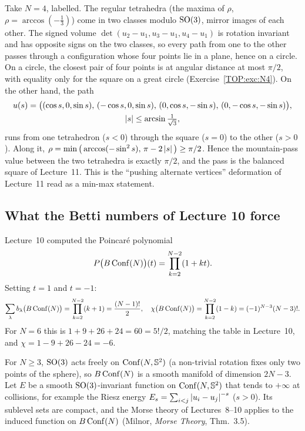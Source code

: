 \begin{example}\label{TOP:ex:N4pass}
Take $N=4$, labelled. The regular tetrahedra (the maxima of $\rho$, $\rho=\arccos(-\tfrac13)$) come
in two classes modulo $\mathrm{SO}(3)$, mirror images of each other. The signed volume
$\det(u_2-u_1,u_3-u_1,u_4-u_1)$ is rotation invariant and has opposite signs on the two classes, so every
path from one to the other passes through a configuration whose four points lie in a plane, hence on a
circle. On a circle, the closest pair of four points is at angular distance at most $\pi/2$, with equality
only for the square on a great circle (Exercise~\ref{TOP:exc:N4}). On the other hand, the path
\[
\begin{gathered}
  u(s)=\big((\cos s,0,\sin s),\,(-\cos s,0,\sin s),\,(0,\cos s,-\sin s),\,(0,-\cos s,-\sin s)\big),\\
  \left\lvert s \right\rvert\le\arcsin\tfrac1{\sqrt3},
\end{gathered}
\]
runs from one tetrahedron ($s<0$) through the square ($s=0$) to the other ($s>0$). Along it,
$\rho=\min\big(\arccos(-\sin^2s),\,\pi-2\left\lvert s \right\rvert\big)\ge\pi/2$. Hence the mountain-pass value between the two
tetrahedra is exactly $\pi/2$, and the pass is the balanced square of Lecture~11. This is the
``pushing alternate vertices'' deformation of Lecture~11 read as a min-max statement.
\end{example}

\subsection{What the Betti numbers of Lecture 10 force}

Lecture~10 computed the Poincar\'e polynomial
\[
  P\big(B\operatorname{Conf}(N)\big)(t)=\prod_{k=2}^{N-2}(1+kt).
\]
Setting $t=1$ and $t=-1$:
\[
  \sum_\lambda b_\lambda\big(B\operatorname{Conf}(N)\big)=\prod_{k=2}^{N-2}(k+1)=\frac{(N-1)!}2,\quad
  \chi\big(B\operatorname{Conf}(N)\big)=\prod_{k=2}^{N-2}(1-k)=(-1)^{N-3}(N-3)!.
\]
For $N=6$ this is $1+9+26+24=60=5!/2$, matching the table in Lecture~10, and $\chi=1-9+26-24=-6$.

For $N\ge3$, $\mathrm{SO}(3)$ acts freely on $\operatorname{Conf}(N,\mathbb{S}^2)$ (a non-trivial rotation fixes only two points of the
sphere), so $B\operatorname{Conf}(N)$ is a smooth manifold of dimension $2N-3$. Let $E$ be a smooth $\mathrm{SO}(3)$-invariant
function on $\operatorname{Conf}(N,\mathbb{S}^2)$ that tends to $+\infty$ at collisions, for example the Riesz energy
$E_s=\sum_{i<j}\left\lvert u_i-u_j \right\rvert^{-s}$ ($s>0$). Its sublevel sets are compact, and the Morse theory of
Lectures~8--10 applies to the induced function on $B\operatorname{Conf}(N)$ (Milnor, \emph{Morse Theory}, Thm.~3.5).

